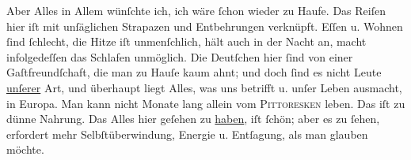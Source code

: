 \pstart
           Aber Alles in Allem wünſchte ich, ich wäre ſchon wieder zu Haufe. Das Reiſen hier iſt
               mit unſäglichen Strapazen und Entbehrungen verknüpft. Eſſen u. Wohnen ſind ſchlecht,
               die Hitze iſt \strikeout{\textcolor{gray}{e}\textcolor{gray}{×}} unmenſchlich, hält auch in der Nacht an, macht infolgedeſſen das Schlafen
               unmöglich. Die Deutſchen hier
               ſind von einer {\pb}Gaſtfreundſchaft, die man zu Hauſe
               kaum ahnt; und doch ſind es nicht Leute \uline{unſerer} Art,
               und überhaupt liegt Alles, was uns betrifft u. unſer Leben ausmacht, in Europa.  Man
               kann nicht Monate lang allein vom \textsc{Pittoresken} leben. Das
               iſt zu dünne Nahrung. Das Alles hier geſehen zu \uline{haben}, iſt ſchön;  aber es zu ſehen, erfordert mehr Selbſtüberwindung, Energie u. Entſagung, als man
               glauben möchte.\pend
           
